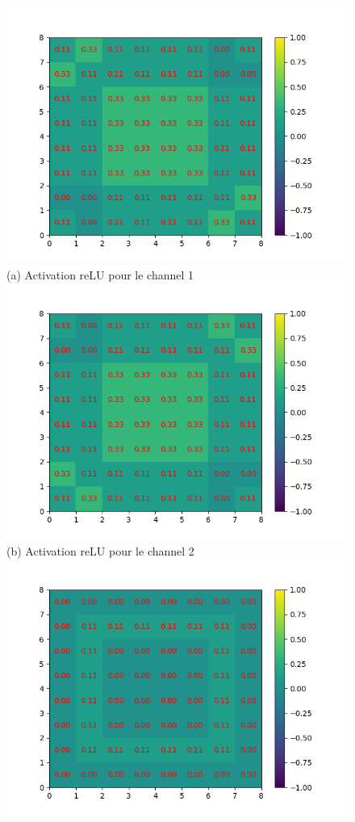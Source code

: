 \begin{figure}[h]
        \includegraphics[width=\textwidth]{img/cnn_exemple/square/activation_relu_1.png}
        \center 
        (a) Activation reLU pour le channel 1
    \endminipage\hfill
        \includegraphics[width=\textwidth]{img/cnn_exemple/square/activation_relu_2.png}
        \center 
        (b) Activation reLU pour le channel 2
    \endminipage\hfill
        \includegraphics[width=\textwidth]{img/cnn_exemple/square/activation_relu_3.png}

\end{figure}
